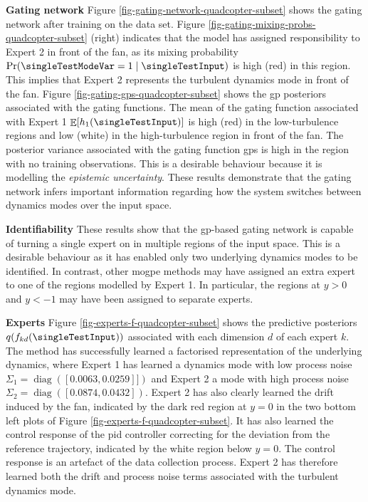 \documentclass{mimosis-class/mimosis}
\numberwithin{equation}{chapter}
\newcommand{\diag}{\mathop{\mathrm{diag}}}
\DeclareMathOperator{\E}{\mathbb{E}}
\newcommand{\modeInd}{\ensuremath{k}}
\newcommand{\latentFunc}{\ensuremath{f}}
\begin{document}
{\textbf{Gating network}
Figure \ref{fig-gating-network-quadcopter-subset} shows the gating network after training on the
data set.
Figure \ref{fig-gating-mixing-probs-quadcopter-subset} (right) indicates that the model has assigned responsibility
to Expert 2 in front of the fan, as its mixing probability
\(\Pr(\singleTestModeVar=1 \mid \singleTestInput)\) is high (red) in this region.
This implies that Expert 2 represents the turbulent dynamics mode in front of the fan.
Figure \ref{fig-gating-gps-quadcopter-subset} shows the \acrshort{gp} posteriors associated with the gating functions.
The mean of the gating function associated with Expert 1 \(\E[h_{1}(\singleTestInput)]\) is
high (red) in the low-turbulence regions and low (white) in the high-turbulence region in front of the fan.
The posterior variance associated with the gating function \acrshort{gps} is high in the region with no training
observations. This is a desirable behaviour because it is modelling the \emph{epistemic uncertainty}.
These results demonstrate that the gating network infers important information regarding how the
system switches between dynamics modes over the input space.

\textbf{Identifiability}
These results show that the \acrshort{gp}-based gating network is capable of turning a single expert
on in multiple regions of the input space.
This is a desirable behaviour as it has enabled only two underlying dynamics modes to be identified.
In contrast, other \acrshort{mogpe} methods may have assigned an extra expert to one of the regions modelled by Expert 1.
In particular, the regions at \(y>0\) and \(y<-1\) may have been assigned to separate experts.

\textbf{Experts}
Figure \ref{fig-experts-f-quadcopter-subset} shows the predictive posteriors \(q(\latentFunc_{kd}(\singleTestInput))\)
associated with each dimension \(d\) of each expert \(\modeInd\).
The method has successfully learned a factorised representation of the underlying dynamics, where
Expert 1 has learned a dynamics mode with low process noise
\(\Sigma_1 = \diag\left([0.0063, 0.0259]]\right)\)
and Expert 2 a mode with high process noise
\(\Sigma_2 = \diag\left([0.0874, 0.0432]\right)\).
Expert 2 has also clearly learned the drift induced by the fan, indicated by the dark red region at \(y=0\)
in the two bottom left plots of Figure \ref{fig-experts-f-quadcopter-subset}.
It has also learned the control response of the \acrshort{pid} controller correcting for the deviation
from the reference trajectory, indicated by the white region below \(y=0\).
The control response is an artefact of the data collection process.
Expert 2 has therefore learned both the drift and process noise terms
associated with the turbulent dynamics mode.

}
\end{document}
